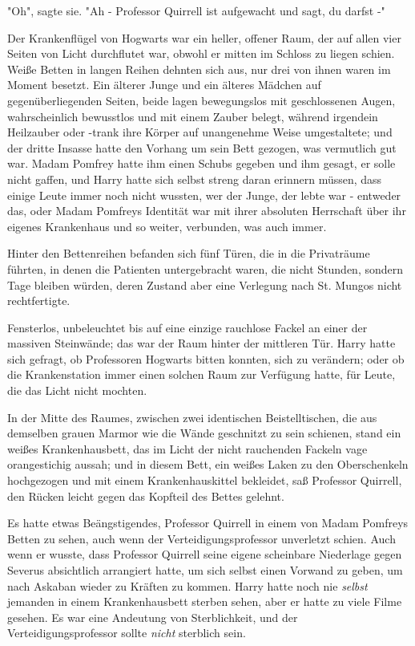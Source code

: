 {"Oh", sagte sie. "Ah - Professor Quirrell ist aufgewacht und sagt, du darfst -"

Der Krankenflügel von Hogwarts war ein heller, offener Raum, der auf allen vier Seiten von Licht durchflutet war, obwohl er mitten im Schloss zu liegen schien. Weiße Betten in langen Reihen dehnten sich aus, nur drei von ihnen waren im Moment besetzt. Ein älterer Junge und ein älteres Mädchen auf gegenüberliegenden Seiten, beide lagen bewegungslos mit geschlossenen Augen, wahrscheinlich bewusstlos und mit einem Zauber belegt, während irgendein Heilzauber oder -trank ihre Körper auf unangenehme Weise umgestaltete; und der dritte Insasse hatte den Vorhang um sein Bett gezogen, was vermutlich gut war. Madam Pomfrey hatte ihm einen Schubs gegeben und ihm gesagt, er solle nicht gaffen, und Harry hatte sich selbst streng daran erinnern müssen, dass einige Leute immer noch nicht wussten, wer der Junge, der lebte war - entweder das, oder Madam Pomfreys Identität war mit ihrer absoluten Herrschaft über ihr eigenes Krankenhaus und so weiter, verbunden, was auch immer.

Hinter den Bettenreihen befanden sich fünf Türen, die in die Privaträume führten, in denen die Patienten untergebracht waren, die nicht Stunden, sondern Tage bleiben würden, deren Zustand aber eine Verlegung nach St. Mungos nicht rechtfertigte.

Fensterlos, unbeleuchtet bis auf eine einzige rauchlose Fackel an einer der massiven Steinwände; das war der Raum hinter der mittleren Tür. Harry hatte sich gefragt, ob Professoren Hogwarts bitten konnten, sich zu verändern; oder ob die Krankenstation immer einen solchen Raum zur Verfügung hatte, für Leute, die das Licht nicht mochten.

In der Mitte des Raumes, zwischen zwei identischen Beistelltischen, die aus demselben grauen Marmor wie die Wände geschnitzt zu sein schienen, stand ein weißes Krankenhausbett, das im Licht der nicht rauchenden Fackeln vage orangestichig aussah; und in diesem Bett, ein weißes Laken zu den Oberschenkeln hochgezogen und mit einem Krankenhauskittel bekleidet, saß Professor Quirrell, den Rücken leicht gegen das Kopfteil des Bettes gelehnt.

Es hatte etwas Beängstigendes, Professor Quirrell in einem von Madam Pomfreys Betten zu sehen, auch wenn der Verteidigungsprofessor unverletzt schien. Auch wenn er wusste, dass Professor Quirrell seine eigene scheinbare Niederlage gegen Severus absichtlich arrangiert hatte, um sich selbst einen Vorwand zu geben, um nach Askaban wieder zu Kräften zu kommen. Harry hatte noch nie \emph{selbst} jemanden in einem Krankenhausbett sterben sehen, aber er hatte zu viele Filme gesehen. Es war eine Andeutung von Sterblichkeit, und der Verteidigungsprofessor sollte \emph{nicht} sterblich sein.

}
